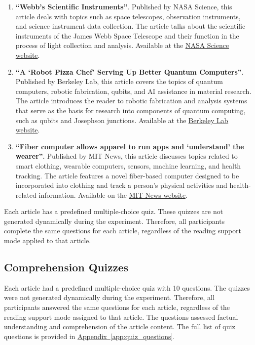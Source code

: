 \documentclass{IEEEtran}
\begin{document}
\begin{enumerate}

\item \textbf{``Webb's Scientific Instruments''}. 
Published by NASA Science, this article deals with topics such as space telescopes, observation instruments, and science instrument data collection. The article talks about the scientific instruments of the James Webb Space Telescope and their function in the process of light collection and analysis. Available at the \href{https://science.nasa.gov/mission/webb/science-overview/science-explainers/webbs-scientific-instruments/}{NASA Science website}.

\item \textbf{``A `Robot Pizza Chef' Serving Up Better Quantum Computers''}. 
Published by Berkeley Lab, this article covers the topics of quantum computers, robotic fabrication, qubits, and AI assistance in material research. The article introduces the reader to robotic fabrication and analysis systems that serve as the basis for research into components of quantum computing, such as qubits and Josephson junctions. Available at the \href{https://newscenter.lbl.gov/2026/02/11/a-robot-pizza-chef-serving-up-better-quantum-computers/}{Berkeley Lab website}.

\item \textbf{``Fiber computer allows apparel to run apps and `understand' the wearer''}. 
Published by MIT News, this article discusses topics related to smart clothing, wearable computers, sensors, machine learning, and health tracking. The article features a novel fiber-based computer designed to be incorporated into clothing and track a person's physical activities and health-related information. Available on the \href{https://news.mit.edu/2025/fiber-computer-allows-apparel-to-run-apps-and-understand-wearer-0226}{MIT News website}.

\end{enumerate}

Each article has a predefined multiple-choice quiz. These quizzes are not generated dynamically during the experiment. Therefore, all participants complete the same questions for each article, regardless of the reading support mode applied to that article.

\subsection{Comprehension Quizzes}

Each article had a predefined multiple-choice quiz with 10 questions. The quizzes were not generated dynamically during the experiment. Therefore, all participants answered the same questions for each article, regardless of the reading support mode assigned to that article. The questions assessed factual understanding and comprehension of the article content. The full list of quiz questions is provided in \hyperref[app:quiz_questions]{Appendix~\ref*{app:quiz_questions}}.
\end{document}
